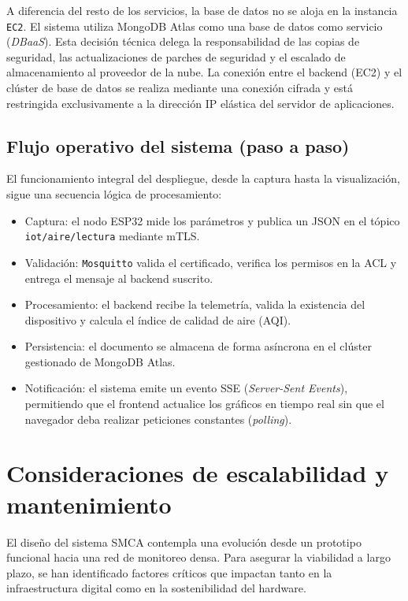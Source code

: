 A diferencia del resto de los servicios, la base de datos no se aloja en la instancia \texttt{EC2}. El sistema utiliza MongoDB Atlas como una base de datos como servicio (\textit{DBaaS}). Esta decisión técnica delega la responsabilidad de las copias de seguridad, las actualizaciones de parches de seguridad y el escalado de almacenamiento al proveedor de la nube. La conexión entre el backend (EC2) y el clúster de base de datos se realiza mediante una conexión cifrada y está restringida exclusivamente a la dirección IP elástica del servidor de aplicaciones.

\subsection{Flujo operativo del sistema (paso a paso)}

El funcionamiento integral del despliegue, desde la captura hasta la visualización, sigue una secuencia lógica de procesamiento:

\begin{itemize}
    \item Captura: el nodo ESP32 mide los parámetros y publica un JSON en el tópico \texttt{iot/aire/lectura} mediante mTLS.
    \item Validación: \texttt{Mosquitto} valida el certificado, verifica los permisos en la ACL y entrega el mensaje al backend suscrito.
    \item Procesamiento: el backend recibe la telemetría, valida la existencia del dispositivo y calcula el índice de calidad de aire (AQI).
    \item Persistencia: el documento se almacena de forma asíncrona en el clúster gestionado de MongoDB Atlas.
    \item Notificación: el sistema emite un evento SSE (\textit{Server-Sent Events}), permitiendo que el frontend actualice los gráficos en tiempo real sin que el navegador deba realizar peticiones constantes (\textit{polling}).
\end{itemize}

\section{Consideraciones de escalabilidad y mantenimiento}

El diseño del sistema SMCA contempla una evolución desde un prototipo funcional hacia una red de monitoreo densa. Para asegurar la viabilidad a largo plazo, se han identificado factores críticos que impactan tanto en la infraestructura digital como en la sostenibilidad del hardware.


